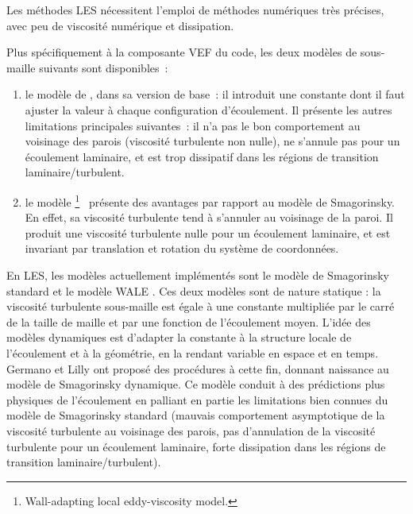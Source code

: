 \begin{rque}
Les m\'ethodes LES n\'ecessitent l'emploi de m\'ethodes num\'eriques tr\`es pr\'ecises, avec peu de viscosit\'e num\'erique et dissipation. 
\end{rque}

Plus sp\'ecifiquement \`a la composante VEF du code,  les deux mod\`eles de sous-maille suivants sont disponibles~: 
\begin{enumerate}
\item
le mod\`ele de {}, dans sa version de base~: il introduit une constante dont il faut ajuster la valeur \`a chaque configuration d'\'ecoulement. Il pr\'esente les autres limitations principales suivantes~:  il n'a pas le bon comportement au voisinage des parois (viscosit\'e turbulente non nulle), ne s'annule pas pour un \'ecoulement laminaire, et est trop dissipatif dans les r\'egions de transition laminaire/turbulent.
\item
le mod\`ele {}\footnote{Wall-adapting local eddy-viscosity model.}~\cite{WALE} pr\'esente des avantages par rapport au mod\`ele de Smagorinsky. En effet, sa viscosit\'e turbulente tend \`a s'annuler au voisinage de la paroi. Il produit une viscosit\'e turbulente nulle pour un \'ecoulement laminaire, et est invariant par translation et rotation du syst\`eme de coordonn\'ees.
\end{enumerate}

En LES, les mod\`eles actuellement impl\'ement\'es sont le mod\`ele de Smagorinsky standard \cite{Smagorinsky1963} et le mod\`ele WALE \cite{Nicoud1999}. Ces deux mod\`eles sont de nature statique : la viscosit\'e turbulente sous-maille est \'egale \`a une constante multipli\'ee par le carr\'e de la taille de maille et par une fonction de l'\'ecoulement moyen. L'id\'ee des mod\`eles dynamiques est d'adapter la {\og constante \fg} \`a la structure locale de l'\'ecoulement et \`a la g\'eom\'etrie, en la rendant variable en espace et en temps. Germano \cite{Germano1991} et Lilly \cite{Lilly1991} ont propos\'e des proc\'edures \`a cette fin, donnant naissance au mod\`ele de Smagorinsky dynamique. Ce mod\`ele conduit \`a des pr\'edictions plus physiques de l'\'ecoulement en palliant en partie les limitations bien connues du mod\`ele de Smagorinsky standard (mauvais comportement asymptotique de la viscosit\'e turbulente au voisinage des parois, pas d'annulation de la viscosit\'e turbulente pour un \'ecoulement laminaire, forte dissipation dans les r\'egions de transition laminaire/turbulent).

